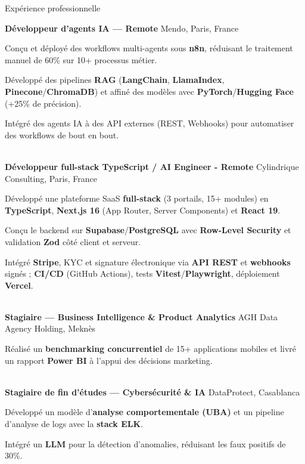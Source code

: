 
\begin{rubric}{Expérience professionnelle}

\entry*[02/2026 -- présent]%
    \textbf{Développeur d'agents IA — Remote}  Mendo, Paris, France
    \par Conçu et déployé des workflows multi-agents sous \textbf{n8n}, réduisant le traitement manuel de 60\% sur 10+ processus métier.
    \par Développé des pipelines \textbf{RAG} (\textbf{LangChain}, \textbf{LlamaIndex}, \textbf{Pinecone}/\textbf{ChromaDB}) et affiné des modèles avec \textbf{PyTorch}/\textbf{Hugging Face} (+25\% de précision).
    \par Intégré des agents IA à des API externes (REST, Webhooks) pour automatiser des workflows de bout en bout.

    \\

\entry*[06/2026 -- 09/2026]%
    \textbf{Développeur full-stack TypeScript / AI Engineer - Remote}  Cylindrique Consulting, Paris, France 
    \par Développé une plateforme SaaS \textbf{full-stack} (3 portails, 15+ modules) en \textbf{TypeScript}, \textbf{Next.js 16} (App Router, Server Components) et \textbf{React 19}.
    \par Conçu le backend sur \textbf{Supabase}/\textbf{PostgreSQL} avec \textbf{Row-Level Security} et validation \textbf{Zod} côté client et serveur.
    \par Intégré \textbf{Stripe}, KYC et signature électronique via \textbf{API REST} et \textbf{webhooks} signés ; \textbf{CI/CD} (GitHub Actions), tests \textbf{Vitest}/\textbf{Playwright}, déploiement \textbf{Vercel}.

    \\
    
\entry*[09/2025 - 12/2025]%
    \textbf{Stagiaire — Business Intelligence \& Product Analytics}  AGH Data Agency Holding, Meknès
    \par Réalisé un \textbf{benchmarking concurrentiel} de 15+ applications mobiles et livré un rapport \textbf{Power BI} à l'appui des décisions marketing.

    \\
    
\entry*[02/2025 - 08/2025]%
    \textbf{Stagiaire de fin d'études — Cybersécurité \& IA}  DataProtect, Casablanca
    \par Développé un modèle d'\textbf{analyse comportementale (UBA)} et un pipeline d'analyse de logs avec la \textbf{stack ELK}.
    \par Intégré un \textbf{LLM} pour la détection d'anomalies, réduisant les faux positifs de 30\%.

\end{rubric}
